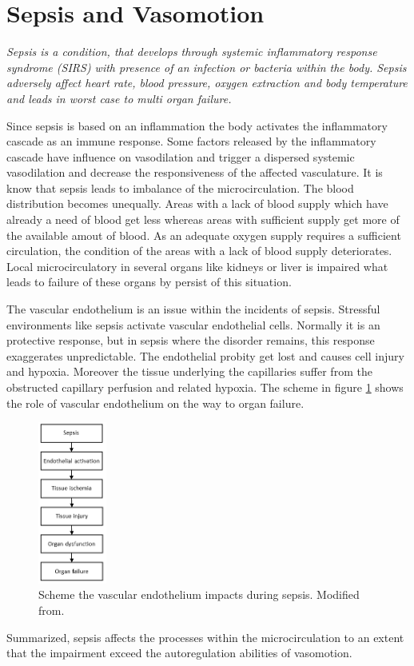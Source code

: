 
\label{chap:sepsis}
\section{Sepsis and Vasomotion}

\textit{Sepsis is a condition, that develops through systemic inflammatory response syndrome (SIRS) with presence of an infection or bacteria within the body. Sepsis adversely affect heart rate, blood pressure, oxygen extraction and body temperature and leads in worst case to multi organ failure.\cite{pluta2010,kanta2014}}

Since sepsis is based on an inflammation the body activates the inflammatory cascade as an immune response. Some factors released by the inflammatory cascade have influence on vasodilation and trigger a dispersed systemic vasodilation and decrease the responsiveness of the affected vasculature. It is know that sepsis leads to imbalance of the microcirculation. The blood distribution becomes unequally. Areas with a lack of blood supply which have already a need of blood get less whereas areas with sufficient supply get more of the available amout of blood. As an adequate oxygen supply requires a sufficient circulation, the condition of the areas with a lack of blood supply deteriorates.
Local microcirculatory in several organs like kidneys or liver is impaired what leads to failure of these organs by persist of this situation.\cite{baudouin2008,kanta2014}

The vascular endothelium is an issue within the incidents of sepsis. Stressful environments like sepsis activate vascular endothelial cells. Normally it is an protective response, but in sepsis where the disorder remains, this response exaggerates unpredictable. The endothelial probity get lost and causes cell injury and hypoxia. Moreover the tissue underlying the capillaries suffer from the obstructed capillary perfusion and related hypoxia. The scheme in figure \ref{fig:Sepsis} shows the role of vascular endothelium on the way to organ failure.\cite{baudouin2008}

\begin{figure}[H]
	\centering	\includegraphics[width=0.2\textwidth]{figures/SepsisEndo}
	\caption{Scheme the vascular endothelium impacts during sepsis. Modified from\cite{baudouin2008}.}
	\label{fig:Sepsis}
\end{figure}

Summarized, sepsis affects the processes within the microcirculation to an extent that the impairment exceed the autoregulation abilities of vasomotion.